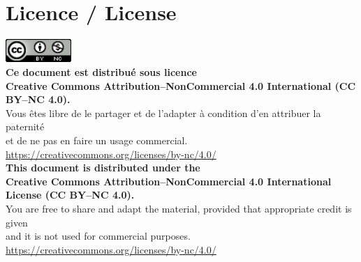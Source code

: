 \documentclass[12pt,a4paper]{article}
\begin{document}
\section*{Licence / License}
\begin{center}
    \includegraphics[width=2.5cm]{figures/cc-by-nc.png}\\[0.5em]
    \textbf{Ce document est distribué sous licence\\
        Creative Commons Attribution–NonCommercial 4.0 International (CC BY–NC 4.0).}\\[0.5em]
    Vous êtes libre de le partager et de l’adapter à condition d’en attribuer la paternité\\
    et de ne pas en faire un usage commercial.\\[0.3em]
    \url{https://creativecommons.org/licenses/by-nc/4.0/}\\[1em]
    \textbf{This document is distributed under the\\
        Creative Commons Attribution–NonCommercial 4.0 International License (CC BY–NC 4.0).}\\[0.5em]
    You are free to share and adapt the material, provided that appropriate credit is given\\
    and it is not used for commercial purposes.\\[0.3em]
    \url{https://creativecommons.org/licenses/by-nc/4.0/}
\end{center}
\end{document}
